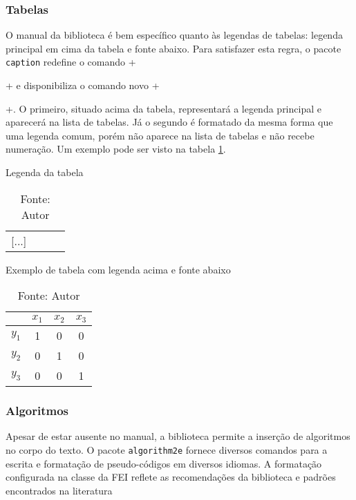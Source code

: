 \documentclass[xindy,rascunho]{fei}
\begin{document}
	\subsubsection{Tabelas}

	O manual da biblioteca é bem específico quanto às legendas de tabelas: legenda principal em cima da tabela e fonte abaixo. Para satisfazer esta regra, o pacote \texttt{caption} redefine o comando \latexinline+\caption{}+ e disponibiliza o comando novo \latexinline+\caption*{}+. O primeiro, situado acima da tabela, representará a legenda principal e aparecerá na lista de tabelas. Já o segundo é formatado da mesma forma que uma legenda comum, porém não aparece na lista de tabelas e não recebe numeração. Um exemplo pode ser visto na tabela \ref{tbl:exemplo}.

\begin{latexcode}
\begin{table}[ht!]
	\caption{Legenda da tabela}
	\begin{tabular}{|c|c|c|c|}
		[...]
	\end{tabular}
	\caption*{Fonte: Autor}
\end{table}
\end{latexcode}

\begin{table}[ht!]
    \caption{Exemplo de tabela com legenda acima e fonte abaixo} \label{tbl:exemplo}
    \centering
    \begin{tabular}{|c|c|c|c|}
    \hline 
    & \(x_1\) & \(x_2\) & \(x_3\) \\ 
    \hline 
    \(y_1\) & 1 & 0 & 0 \\ 
    \hline 
    \(y_2\) & 0 & 1 & 0 \\ 
    \hline 
    \(y_3\) & 0 & 0 & 1 \\ 
    \hline 
    \end{tabular}
    \caption*{Fonte: Autor}
\end{table}
	
	\subsubsection{Algoritmos}
    
    Apesar de estar ausente no manual, a biblioteca permite a inserção de algoritmos no corpo do texto. O pacote \texttt{algorithm2e} fornece diversos comandos para a escrita e formatação de pseudo-códigos em diversos idiomas. A formatação configurada na classe da FEI reflete as recomendações da biblioteca e padrões encontrados na literatura
    
\end{document}
